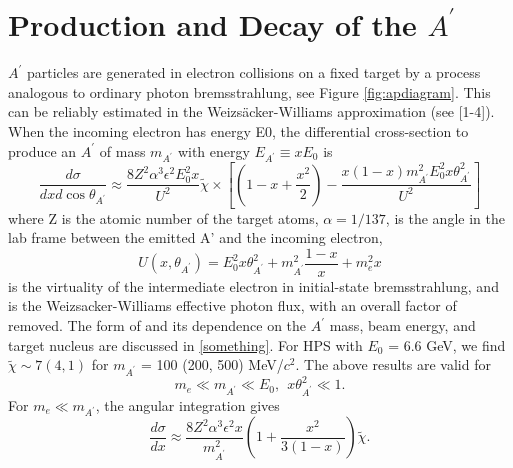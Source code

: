 \section{Production and Decay of the $A^\prime$}
\label{app:ProdAndDecay}

\def \ap {A^\prime}
\def \map {m_{A^\prime}}
\def \thap {\theta_{A^\prime}}


$\ap$ particles are generated in electron collisions on a fixed target by a process analogous to ordinary photon bremsstrahlung, see Figure \ref{fig:apdiagram}.  This can be reliably estimated in the Weizsäcker-Williams approximation (see [1-4]).  When the incoming electron has energy E0, the differential cross-section to produce an $\ap$ of mass $m_{\ap}$ with energy $E_{\ap}\equiv x E_0$ is 
\begin{equation}
\frac{d\sigma}{dxd\cos{\theta_{\ap}}}\approx \frac{8Z^2\alpha^3\epsilon^2 E_0^2 x}{U^2}\tilde{\chi}\times\left[\left(1-x+\frac{x^2}{2}\right)-\frac{x(1-x)m_{\ap}^2E_0^2x\theta_{\ap}^2}{U^2}\right]
\end{equation}
where Z is the atomic number of the target atoms, $\alpha = 1/137$,  is the angle in the lab frame between the emitted A' and the incoming electron, 
\begin{equation}
U(x,\theta_{\ap})=E_0^2x\theta_{\ap}^2+m_{\ap}^2\frac{1-x}{x}+m_e^2x
\label{eq:u}
\end{equation}
is the virtuality of the intermediate electron in initial-state bremsstrahlung, and  is the Weizsacker-Williams effective photon flux, with an overall factor of  removed.  The form of  and its dependence on the $\ap$ mass, beam energy, and target nucleus are discussed in \ref{something}.  For HPS with $E_0$ = 6.6 GeV, we find $\tilde{\chi}\sim 7 (4, 1)$ for $m_{\ap}$ = 100 (200, 500) MeV/$c^2$.
The above results are valid for 
\begin{equation}
m_e\ll m_{\ap}\ll E_0  , ~~ x\theta_{\ap}^2\ll 1.
\end{equation}
For $m_e\ll m_{\ap}$, the angular integration gives
\begin{equation}
\frac{d\sigma}{dx}\approx \frac{8Z^2\alpha^3\epsilon^2 x}{m_{\ap}^2}\left(1+\frac{x^2}{3(1-x)}\right)\tilde{\chi} .
\end{equation}

